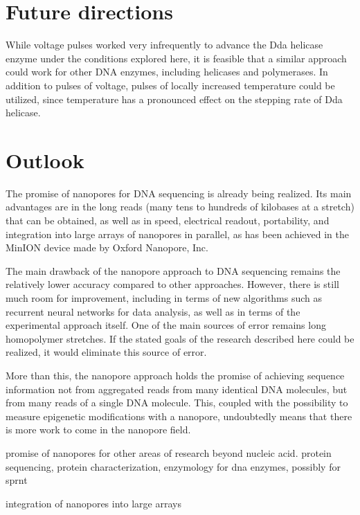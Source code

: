 \section{Future directions}

While voltage pulses worked very infrequently to advance the Dda helicase enzyme under the conditions explored here, it is feasible that a similar approach could work for other DNA enzymes, including helicases and polymerases.  In addition to pulses of voltage, pulses of locally increased temperature could be utilized, since temperature has a pronounced effect on the stepping rate of Dda helicase.

\section{Outlook}

The promise of nanopores for DNA sequencing is already being realized.  Its main advantages are in the long reads (many tens to hundreds of kilobases at a stretch) that can be obtained, as well as in speed, electrical readout, portability, and integration into large arrays of nanopores in parallel, as has been achieved in the MinION device made by Oxford Nanopore, Inc.

The main drawback of the nanopore approach to DNA sequencing remains the relatively lower accuracy compared to other approaches.  However, there is still much room for improvement, including in terms of new algorithms such as recurrent neural networks for data analysis, as well as in terms of the experimental approach itself.  One of the main sources of error remains long homopolymer stretches.  If the stated goals of the research described here could be realized, it would eliminate this source of error.

More than this, the nanopore approach holds the promise of achieving sequence information not from aggregated reads from many identical DNA molecules, but from many reads of a single DNA molecule.  This, coupled with the possibility to measure epigenetic modifications with a nanopore, undoubtedly means that there is more work to come in the nanopore field.

promise of nanopores for other areas of research beyond nucleic acid.  protein sequencing, protein characterization, enzymology for dna enzymes, possibly for sprnt

integration of nanopores into large arrays
